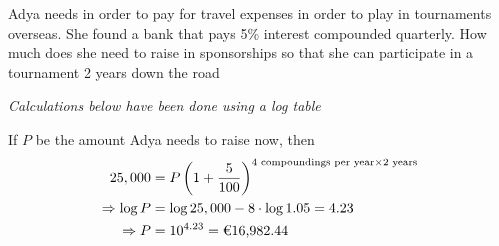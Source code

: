 
%
%
%
%
% 

\question[3]  Adya needs  in order to pay for travel expenses in order to 
play in tournaments overseas. She found a bank that pays 5\% interest compounded quarterly. 
How much does she need to raise in sponsorships so that she can participate in a 
tournament 2 years down the road


\ifprintanswers
\fi 

\begin{solution}[\halfpage]
  \textit{Calculations below have been done using a log table}

  If $P$ be the amount Adya needs to raise now, then 
	\begin{align}
			   25,000 &= P\left(1+\dfrac{5}{100}\right)^{4\text{ compoundings per year}\times 2\text{ years}} \\
         \Rightarrow \log P &= \log 25,000 - 8\cdot\log 1.05 = 4.23 \\
         \Rightarrow P &= 10^{4.23} = \text{\texteuro{16,982.44}}
	\end{align}

\end{solution}
